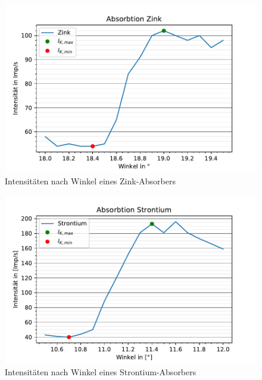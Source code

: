   \begin{figure}
    \centering
    \includegraphics{AbsorbtionsspektrumZink.pdf}
    \caption{Intensitäten nach Winkel eines Zink-Absorbers}
    \label{fig:EmspektrumV}
  \end{figure}

  \begin{figure}
    \centering
    \includegraphics{AbsorbtionsspektrumStrontium.pdf}
    \caption{Intensitäten nach Winkel eines Strontium-Absorbers}
    \label{fig:EmspektrumVI}
  \end{figure}

